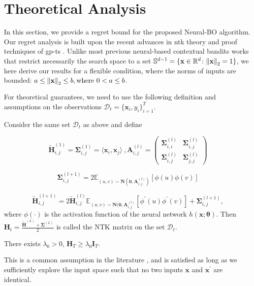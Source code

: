 \section{Theoretical Analysis}
\label{section:neural-bo_regret_analysis}

In this section, we provide a regret bound for the proposed Neural-BO algorithm. Our regret analysis is built upon the recent advances in \ac{ntk} theory \citep{allen2019convergence, cao2019generalization} and proof techniques of \ac{gp}-\ac{ts} \citep{chowdhury2017kernelized}. 
Unlike most previous neural-based contextual bandits works \citep{zhang2021neural, zhou2020neural} that restrict necessarily the search space to a set $\mathbb{S}^{d-1} = \{ \mathbf{x} \in \mathbb {R}^d \colon \norm{\mathbf{x}}_2 = 1 \}$, we here derive our results for a flexible condition, where the norms of inputs are bounded: $a \leq \norm{\mathbf{x}}_2 \leq b, \text{where } 0 < a \le b$. 

For theoretical guarantees, we need to use the following definition and assumptions on the observations $\mathcal{D}_t = \{\mathbf{x}_i, y_i\}^T_{i=1}$.


\begin{definition} 
\label{def:NTK_matrix}
Consider the same set $\mathcal{D}_t$ as above and define

\[ \widetilde{\mathbf{H}}_{i,j}^{(1)} = \mathbf{\Sigma}_{i,j}^{(1)} = \langle  \mathbf{x}_i, \mathbf{x}_j \rangle\ , \mathbf{A}_{i,j}^{(l)} = 
\begin{pmatrix}
\mathbf{\Sigma}_{i,i}^{(l)} & \mathbf{\Sigma}_{i,j}^{(l)} 
\\
\mathbf{\Sigma}_{i,j}^{(l)} & \mathbf{\Sigma}_{j,j}^{(l)}
\end{pmatrix}\] 

\[\mathbf{\Sigma}_{i,j}^{(l+1)} = 2 \mathbb{E}_{(u,v) \sim \mathbf{N}(\mathbf{0}, \mathbf{A}_{i,j}^{(l)})} [\phi(u) \phi(v)] \]

\[ \widetilde{\mathbf{H}}_{i,j}^{(l+1)} = 2\widetilde{\mathbf{H}}_{i,j}^{(l)}\mathbb{E}_{(u,v) \sim \mathbf{N}(\mathbf{0}, \mathbf{A}_{i,j}^{(l)}} [\phi^\prime(u) \phi^\prime(v)] + \mathbf{\Sigma}_{i,j}^{(l+1)}, \]
where $\phi(\cdot)$ is the activation function of the neural network $h(\mathbf{x}; \boldsymbol{\theta})$.
Then $\mathbf{H}_t = \frac{\mathbf{\widetilde{H}}^{(L)}+ \mathbf{\Sigma} ^ {(L)}}{2}$ is called the NTK matrix on the set $\mathcal{D}_t$. 
\end{definition}


\begin{assumption} \label{assumption:sufficient_exploration} There exists $\lambda_0 > 0$, 
$\mathbf{H}_T \ge \lambda_0 \mathbf{I}_T$.
\end{assumption}
This is a common assumption in the literature \citep{zhou2020neural,xu2020neural,zhang2021neural}, and is satisfied as long as we sufficiently explore the input space such that no two inputs $\mathbf{x}$ and $\mathbf{x}^\prime$ are identical.  

